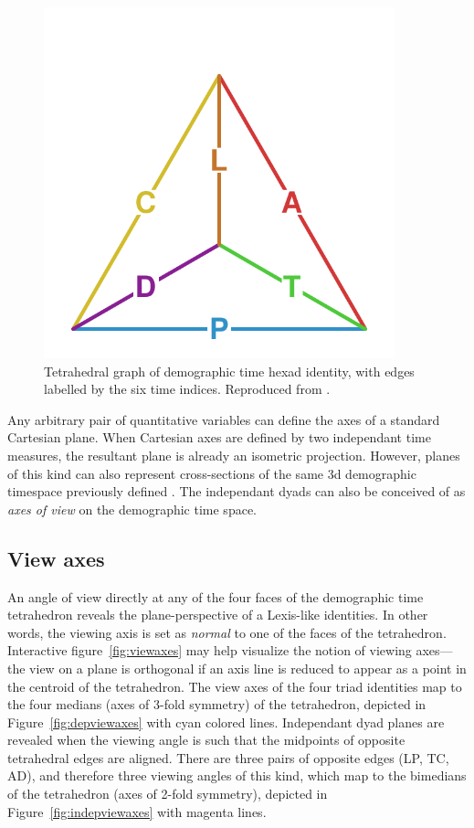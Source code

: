 \begin{figure}[h!]
\centering
\caption{Tetrahedral graph of demographic time hexad identity, with edges
labelled by the six time indices. Reproduced from 
\citet{riffe2017demographictime}.}
\label{fig:tet}
\includegraphics[width=4in]{Figures/TetraHedronEdgesOnly.pdf}%
\end{figure}

Any arbitrary pair of quantitative variables can define the axes of a standard Cartesian plane. When Cartesian axes are defined by two independant time measures, the resultant plane is already an isometric projection. However, planes of this kind can also represent cross-sections of the same 3d demographic timespace previously defined \citep{riffe2017demographictime}. The independant dyads can also be conceived of as \emph{axes of view} on the demographic time space.

\subsection{View axes}
An angle of view directly at any of the four faces of the demographic time tetrahedron reveals the plane-perspective of a Lexis-like identities. In other words, the viewing axis is set as \emph{normal} to one of the faces of the tetrahedron. Interactive figure~\ref{fig:viewaxes} may help visualize the notion of viewing axes--- the view on a plane is orthogonal if an axis line is reduced to appear as a point in the centroid of the tetrahedron. The view axes of the four triad identities map to the four medians (axes of 3-fold symmetry) of the tetrahedron, depicted in
Figure~\ref{fig:depviewaxes} with cyan colored lines. Independant dyad planes are revealed when the viewing angle is such that the midpoints of opposite tetrahedral edges are aligned. There are three pairs of opposite edges (LP, TC, AD), and therefore three viewing angles of this kind, which map to the bimedians of the tetrahedron (axes of 2-fold symmetry), depicted in Figure~\ref{fig:indepviewaxes} with magenta lines.

